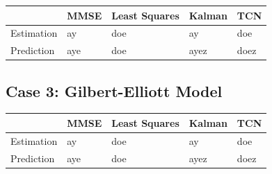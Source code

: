 \documentclass[twocolumn,letterpaper]{IEEEAerospaceCLS}  %
\begin{document}
\begin{table}[!h]
\begin{tabular}{|l|l|l|l|l|}
\hline
                            & MMSE                 & Least Squares        & Kalman         & TCN                   \\ \hline
\multirow{3}{*}{Estimation} & \multirow{3}{*}{ay}  & \multirow{3}{*}{doe} & \multirow{3}{*}{ay}   & \multirow{3}{*}{doe}  \\
                            &                      &                      &                       &                       \\
                            &                      &                      &                       &                       \\ \hline
\multirow{3}{*}{Prediction} & \multirow{3}{*}{aye} & \multirow{3}{*}{doe} & \multirow{3}{*}{ayez} & \multirow{3}{*}{doez} \\
                            &                      &                      &                       &                       \\
                            &                      &                      &                       &                       \\ \hline
\end{tabular}
\end{table}


\subsection{Case 3: Gilbert-Elliott Model}

\begin{table}[!h]
\begin{tabular}{|l|l|l|l|l|}
\hline
                            & MMSE                 & Least Squares        & Kalman         & TCN                   \\ \hline
\multirow{3}{*}{Estimation} & \multirow{3}{*}{ay}  & \multirow{3}{*}{doe} & \multirow{3}{*}{ay}   & \multirow{3}{*}{doe}  \\
                            &                      &                      &                       &                       \\
                            &                      &                      &                       &                       \\ \hline
\multirow{3}{*}{Prediction} & \multirow{3}{*}{aye} & \multirow{3}{*}{doe} & \multirow{3}{*}{ayez} & \multirow{3}{*}{doez} \\
                            &                      &                      &                       &                       \\
                            &                      &                      &                       &                       \\ \hline
\end{tabular}
\end{table}
\end{document}
